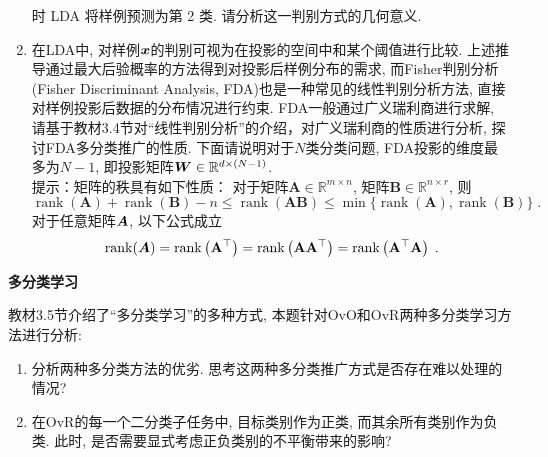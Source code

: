 \documentclass[answers]{exam}  %
\begin{document}
\begin{questions}
\begin{enumerate}
\begin{equation}
	\end{equation}时 LDA 将样例预测为第 2 类. 请分析这一判别方式的几何意义.
	\item 在LDA中, 对样例${\boldsymbol{x}}$的判别可视为在投影的空间中和某个阈值进行比较. 上述推导通过最大后验概率的方法得到对投影后样例分布的需求, 而Fisher判别分析 (Fisher Discriminant Analysis, FDA)也是一种常见的线性判别分析方法, 直接对样例投影后数据的分布情况进行约束. 
FDA一般通过广义瑞利商进行求解, 请基于教材3.4节对“线性判别分析”的介绍，对广义瑞利商的性质进行分析, 探讨FDA多分类推广的性质.
下面请说明对于$N$类分类问题, FDA投影的维度最多为$N-1$, 即投影矩阵$\boldsymbol{W}\in\mathbb{R}^{d\times (N-1)}$.\\
    提示：矩阵的秩具有如下性质：
    对于矩阵$\mathbf{A}\in\mathbb{R}^{m \times n}$, 矩阵$\mathbf{B}\in\mathbb{R}^{n \times r}$, 则
    \begin{equation}
        \operatorname{rank}(\mathbf{A})+\operatorname{rank}(\mathbf{B})-n \leq \operatorname{rank}(\mathbf{A B}) \leq \min \{\operatorname{rank}(\mathbf{A}), \operatorname{rank}(\mathbf{B})\}\;.
    \end{equation}
    对于任意矩阵$\boldsymbol{A}$, 以下公式成立
    \begin{equation}
    \operatorname{rank}(\boldsymbol{A})=\operatorname{rank}\left(\mathbf{A}^{\top}\right)=\operatorname{rank}\left(\mathbf{A} \mathbf{A}^{\top}\right)=\operatorname{rank}\left(\mathbf{A}^{\top} \mathbf{A}\right)\;.
    \end{equation}
\end{enumerate}
	\begin{solution}
	\end{solution}


\question [20] \textbf{多分类学习}

	教材3.5节介绍了“多分类学习”的多种方式, 本题针对OvO和OvR两种多分类学习方法进行分析:
\begin{enumerate}
    \item 分析两种多分类方法的优劣. 思考这两种多分类推广方式是否存在难以处理的情况?
    \item 在OvR的每一个二分类子任务中, 目标类别作为正类, 而其余所有类别作为负类. 此时, 是否需要显式考虑正负类别的不平衡带来的影响?
\end{enumerate}
	\begin{solution}
	\end{solution}

\end{questions}
\end{document}
